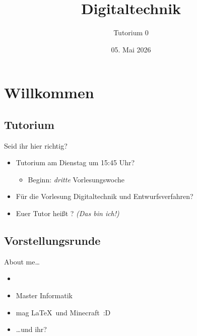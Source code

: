 \documentclass[aspectratio=169,usepdftitle=true,11pt,ngerman,t]{beamer}
\subtitle{Tutorium 0}
\date{05. Mai 2026}
\title{\texorpdfstring{\rlap{Digitaltechnik und Entwurfsverfahren}}{Digitaltechnik und Entwurfsverfahren}}
\begin{document}
\title{Digitaltechnik}
\begin{frame}[plain]\titlepage\end{frame}

\section{Willkommen}

\subsection{Tutorium}

\begin{frame}{Seid ihr hier richtig?}\onslide<+->
    \begin{itemize}[<+->]
        \item[\alt<.>{\usebeamertemplate{itemize item}}{\faCheck}] Tutorium am Dienstag um 15:45 Uhr?\pause%
        \begin{itemize}
            \item Beginn: \emph{dritte} Vorlesungswoche
        \end{itemize}
        \item[\faCheck] Für die Vorlesung Digitaltechnik und Entwurfsverfahren?
        \item[\faCheck] Euer Tutor heißt \lqfullname? \onslide<+->\textit{\color{lightgray} (Das bin ich!)}
    \end{itemize}
    \vspace{1em}
    \begin{center}
        \onslide<+->\fontsize{50}{70}\selectfont{}
    \end{center}
\end{frame}

\subsection{Vorstellungsrunde}

\begin{frame}{About me\dots}\onslide<+->
    \begin{itemize}
        \item \lqfirstname%
        \item Master Informatik
        \item mag \LaTeX~und Minecraft~:D
        \vspace{2em}\item<+-> \dots und ihr?
    \end{itemize}
\end{frame}
\end{document}
